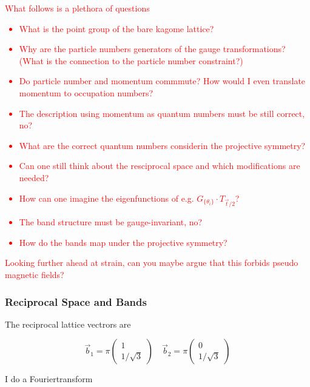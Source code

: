 \documentclass[../../../main.tex]{subfiles}
\begin{document}
\textcolor{red}{What follows is a plethora of questions 
	\begin{itemize}
		\item What is the point group of the bare kagome lattice?
		\item Why are the particle numbers generators of the gauge transformations? (What is the connection to the particle number constraint?) 
		\item Do particle number and momentum commmute? How would I even translate momentum to occupation numbers?
		\item The description using momentum as quantum numbers must be still correct, no?
		\item What are the correct quantum numbers considerin the projective symmetry?
		\item Can one still think about the resciprocal space and which modifications are needed?
		\item How can one imagine the eigenfunctions of e.g. $G_{\{\theta_i\}}\cdot T_{\vec{t}/2}$?
		\item The band structure must be gauge-invariant, no?
		\item How do the bands map under the projective symmetry?
	\end{itemize}
}

\textcolor{red}{Looking further ahead at strain, can you maybe argue that this forbids pseudo magnetic fields?}

\fi

\subsubsection{Reciprocal Space and Bands}

The reciprocal lattice vectrors are 

\begin{equation}
	\vec{b}_{1} = \pi
	\begin{pmatrix}
		1 \\
		1/\sqrt{3}
	\end{pmatrix} \quad 
	\vec{b}_2 = \pi 
	\begin{pmatrix}
		0 \\
		1/\sqrt{3}
	\end{pmatrix}
\end{equation}

I do a Fouriertransform 
\end{document}
